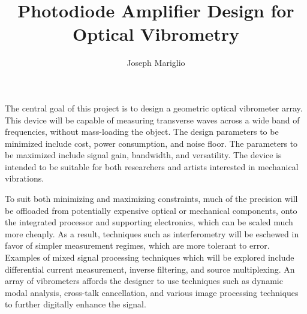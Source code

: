 \documentclass[a4paper,10pt, twocolumn]{report}
\title{Photodiode Amplifier Design for Optical Vibrometry}
\author{Joseph Mariglio}
\begin{document}
\maketitle

\begin{abstract}

\end{abstract}
The central goal of this project is to design a geometric optical vibrometer array. 
This device will be capable of measuring transverse waves across a wide band of frequencies, without mass-loading the object. 
The design parameters to be minimized include cost, power consumption, and noise floor. 
The parameters to be maximized include signal gain, bandwidth, and versatility. 
The device is intended to be suitable for both researchers and artists interested in mechanical vibrations.

To suit both minimizing and maximizing constraints, much of the precision will be offloaded from potentially expensive optical or mechanical components, onto the integrated processor and supporting electronics, which can be scaled much more cheaply. As a result, techniques such as interferometry will be eschewed in favor of simpler measurement regimes, which are more tolerant to error. Examples of mixed signal processing techniques which will be explored include differential current measurement, inverse filtering, and source multiplexing. An array of vibrometers affords the designer to use techniques such as dynamic modal analysis, cross-talk cancellation, and various image processing techniques to further digitally enhance the signal.
\end{document}
